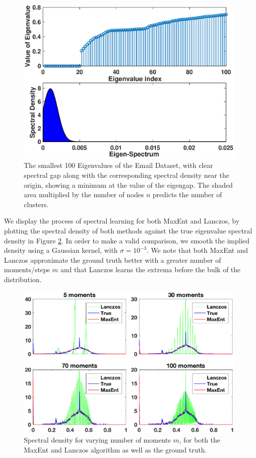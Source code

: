 \documentclass{article}
\begin{document}
\begin{figure}[t]
	\centering
	\includegraphics[trim=0.1cm 0cm 0.1cm 0.1cm, clip, width=1.0\linewidth]{Figures/EmailStemGraph}
	\caption{The smallest 100 Eigenvalues of the Email Dataset, with clear spectral gap along with the corresponding spectral density near the origin, showing a minimum at the value of the eigengap. The shaded area multiplied by the number of nodes $n$ predicts the number of clusters.}
	\label{fig:email}	
\end{figure} 

We display the process of spectral learning for both MaxEnt and Lanczos, by plotting the spectral density of both methods against the true eigenvalue spectral density in Figure \ref{fig:emaildensity}. In order to make a valid comparison, we smooth the implied density using a Gaussian kernel, with $\sigma = 10^{-3}$. We note that both MaxEnt and Lanczos approximate the ground truth better with a greater number of moments/steps $m$ and that Lanczos learns the extrema before the bulk of the distribution.

\begin{figure}[t]
	\centering
	\includegraphics[trim=0.5cm 0.5cm 0.5cm 0.5cm, clip, width=1.0\linewidth]{Figures/Email_distribution}
	\caption{Spectral density for varying number of moments $m$, for both the MaxEnt and Lanczos algorithm as well as the ground truth.}
	\label{fig:emaildensity}	
\end{figure} 
\end{document}
